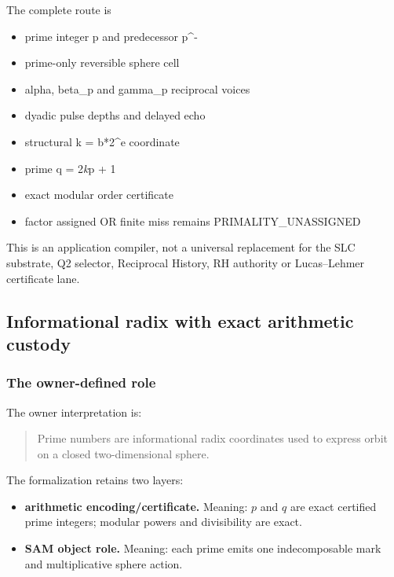 The complete route is

\begin{itemize}
\tightlist
\item
  prime integer p and predecessor p\^{}-
\item
  prime-only reversible sphere cell
\item
  alpha, beta\_p and gamma\_p reciprocal voices
\item
  dyadic pulse depths and delayed echo
\item
  structural k = b*2\^{}e coordinate
\item
  prime q = 2\emph{k}p + 1
\item
  exact modular order certificate
\item
  factor assigned OR finite miss remains PRIMALITY\_UNASSIGNED
\end{itemize}

This is an application compiler, not a universal replacement for the SLC
substrate, Q2 selector, Reciprocal History, RH authority or
Lucas--Lehmer certificate lane.

\subsection{Informational radix with exact arithmetic
custody}\label{viii-ch10-informational-radix-with-exact-arithmetic-custody}

\subsubsection{The owner-defined role}\label{viii-ch10-the-owner-defined-role}

The owner interpretation is:

\begin{quote}
Prime numbers are informational radix coordinates used to express orbit
on a closed two-dimensional sphere.
\end{quote}

The formalization retains two layers:

\begin{itemize}
\tightlist
\item
  \textbf{arithmetic encoding/certificate.} Meaning: \(p\) and \(q\) are
  exact certified prime integers; modular powers and divisibility are
  exact.
\item
  \textbf{SAM object role.} Meaning: each prime emits one indecomposable
  mark and multiplicative sphere action.
\end{itemize}

